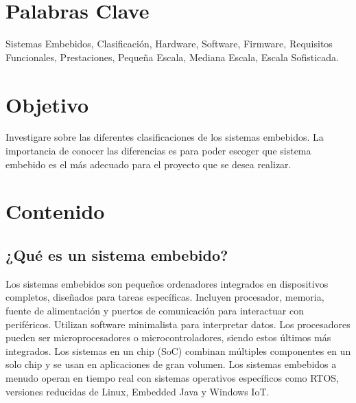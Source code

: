 \documentclass[12pt]{report}
\begin{document}
\chapter*{Palabras Clave}
Sistemas Embebidos, Clasificación, Hardware, Software, Firmware, Requisitos Funcionales, Prestaciones, Pequeña Escala, Mediana Escala, Escala Sofisticada.
\newpage

\chapter*{Objetivo}
Investigare sobre las diferentes clasificaciones de los sistemas embebidos. La importancia de conocer las diferencias es para poder escoger que sistema embebido es el más adecuado para el proyecto que se desea realizar.
\newpage

\chapter{Contenido}
\section{¿Qué es un sistema embebido?}
Los sistemas embebidos son pequeños ordenadores integrados en dispositivos completos, diseñados para tareas específicas. Incluyen procesador, memoria, fuente de alimentación y puertos de comunicación para interactuar con periféricos. Utilizan software minimalista para interpretar datos. Los procesadores pueden ser microprocesadores o microcontroladores, siendo estos últimos más integrados. Los sistemas en un chip (SoC) combinan múltiples componentes en un solo chip y se usan en aplicaciones de gran volumen. Los sistemas embebidos a menudo operan en tiempo real con sistemas operativos específicos como RTOS, versiones reducidas de Linux, Embedded Java y Windows IoT.\cite{1}
\end{document}
